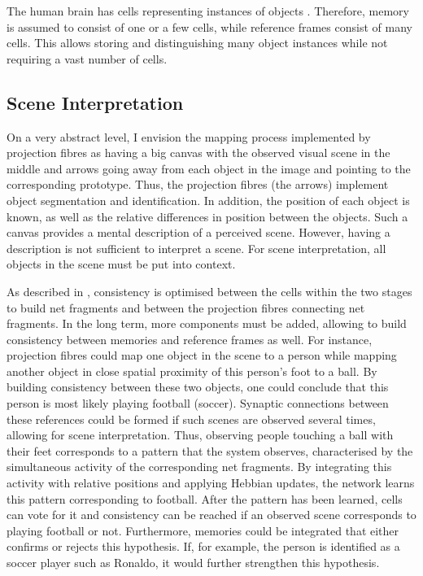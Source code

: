 The human brain has cells representing instances of objects .
Therefore, memory is assumed to consist of one or a few cells, while reference frames consist of many cells.
This allows storing and distinguishing many object instances while not requiring a vast number of cells.


\subsection{Scene Interpretation}
On a very abstract level, I envision the mapping process implemented by projection fibres as having a big canvas with the observed visual scene in the middle and arrows going away from each object in the image and pointing to the corresponding prototype. Thus, the projection fibres (the arrows) implement object segmentation and identification.
In addition, the position of each object is known, as well as the relative differences in position between the objects.
Such a canvas provides a mental description of a perceived scene. However, having a description is not sufficient to interpret a scene. For scene interpretation, all objects in the scene must be put into context.

As described in , consistency is optimised between the cells within the two stages to build net fragments and between the projection fibres connecting net fragments.
In the long term, more components must be added, allowing to build consistency between memories and reference frames as well.
For instance, projection fibres could map one object in the scene to a person while mapping another object in close spatial proximity of this person's foot to a ball. By building consistency between these two objects, one could conclude that this person is most likely playing football (soccer). Synaptic connections between these references could be formed if such scenes are observed several times, allowing for scene interpretation.
Thus, observing people touching a ball with their feet corresponds to a pattern that the system observes, characterised by the simultaneous activity of the corresponding net fragments. By integrating this activity with relative positions and applying Hebbian updates, the network learns this pattern corresponding to football. 
After the pattern has been learned, cells can vote for it and consistency can be reached if an observed scene corresponds to playing football or not.
Furthermore, memories could be integrated that either confirms or rejects this hypothesis. If, for example, the person is identified as a soccer player such as Ronaldo, it would further strengthen this hypothesis.

